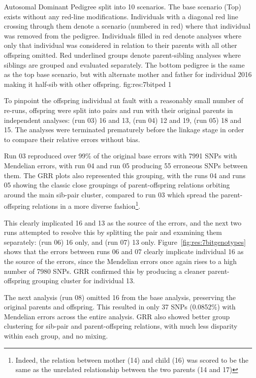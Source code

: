 {Autosomal Dominant Pedigree split into 10 scenarios. The base scenario (Top) exists without any red-line modifications. Individuals with a diagonal red line crossing through them denote a scenario (numbered in red) where that individual was removed from the pedigree. Individuals filled in red denote analyses where only that individual was considered in relation to their parents with all other offspring omitted. Red underlined groups denote parent-sibling analyses where siblings are grouped and evaluated separately. The bottom pedigree is the same as the top base scenario, but with alternate mother and father  for individual 2016 making it half-sib with other offspring.}
{fig:res:7bitped}
{1}
{}

\pagebreak
To pinpoint the offspring individual at fault with a reasonably small number of re-runs, offspring were split into pairs and run with their original parents in independent analyses: (run 03) 16 and 13, (run 04) 12 and 19, (run 05) 18 and 15. The analyses were terminated prematurely before the linkage stage in order to compare their relative errors without bias.

Run 03 reproduced over 99\% of the original base errors with 7991 SNPs with Mendelian errors, with run 04 and run 05 producing 55 erroneous SNPs between them. The GRR plots also represented this grouping, with the runs 04 and runs 05 showing the classic close groupings of parent-offspring relations orbiting around the main sib-pair cluster, compared to run 03 which spread the parent-offspring relations in a more diverse fashion\footnote{Indeed, the relation between mother (14) and child (16) was scored to be the same as the unrelated relationship between the two parents (14 and 17)}.

This clearly implicated 16 and 13 as the source of the errors, and the next two runs attempted to resolve this by splitting the pair and examining them separately: (run 06) 16 only, and (run 07) 13 only. Figure~\ref{fig:res:7bitgenotypes} shows that the errors between runs 06 and 07 clearly implicate individual 16 as the source of the errors, since the Mendelian errors once again rises to a high number of 7980 SNPs.  GRR confirmed this by producing a cleaner parent-offspring grouping cluster for individual 13.

The next analysis (run 08) omitted 16 from the base analysis, preserving the original parents and offspring. This resulted in only 37 SNPs (0.0852\%) with Mendelian errors across the entire analysis. GRR also showed better group clustering for sib-pair and parent-offspring relations, with much less disparity within each group, and no mixing.

